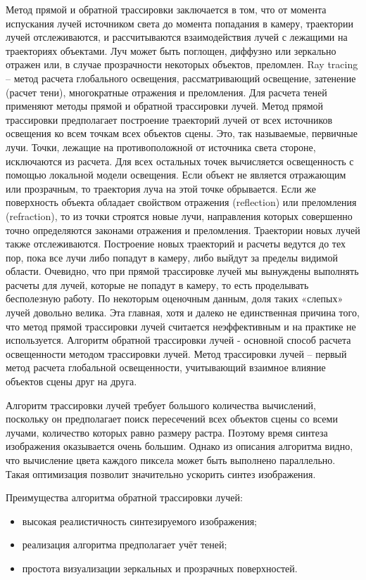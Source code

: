 Метод прямой и обратной трассировки \cite{ray} заключается в том, что от момента испускания лучей
источником света до момента попадания в камеру, траектории лучей отслеживаются, и рассчитываются
взаимодействия лучей с лежащими на траекториях объектами. Луч может быть поглощен, диффузно или
зеркально отражен или, в случае прозрачности некоторых объектов, преломлен.
Ray tracing – метод расчета глобального освещения, рассматривающий освещение, затенение
(расчет тени), многократные отражения и преломления.
Для расчета теней применяют методы прямой и обратной трассировки лучей.
Метод прямой трассировки предполагает построение траекторий лучей от всех источников
освещения ко всем точкам всех объектов сцены. Это, так называемые, первичные лучи. Точки,
лежащие на противоположной от источника света стороне, исключаются из расчета. Для всех
остальных точек вычисляется освещенность с помощью локальной модели освещения. Если
объект не является отражающим или прозрачным, то траектория луча на этой точке обрывается. Если
же поверхность объекта обладает свойством отражения (reflection) или преломления (refraction), то из
точки строятся новые лучи, направления которых совершенно точно определяются законами
отражения и преломления. Траектории новых лучей также отслеживаются. Построение новых
траекторий и расчеты ведутся до тех пор, пока все лучи либо попадут в камеру, либо выйдут за
пределы видимой области. Очевидно, что при прямой трассировке лучей мы вынуждены
выполнять расчеты для лучей, которые не попадут в камеру, то есть проделывать бесполезную
работу. По некоторым оценочным данным, доля таких «слепых» лучей довольно велика. Эта
главная, хотя и далеко не единственная причина того, что метод прямой трассировки лучей
считается неэффективным и на практике не используется.
Алгоритм обратной трассировки лучей - основной способ расчета освещенности методом
трассировки лучей. Метод трассировки лучей – первый метод расчета глобальной освещенности,
учитывающий взаимное влияние объектов сцены друг на друга.

Алгоритм трассировки лучей требует большого количества вычислений, поскольку он
предполагает поиск пересечений всех объектов сцены со всеми лучами, количество которых
равно размеру растра. Поэтому время синтеза изображения оказывается очень большим.
Однако из описания алгоритма видно, что вычисление цвета каждого пиксела может быть
выполнено параллельно. Такая оптимизация позволит значительно ускорить синтез изображения.

Преимущества алгоритма обратной трассировки лучей:
\begin{itemize}
	\item высокая реалистичность синтезируемого изображения;
	\item реализация алгоритма предполагает учёт теней;
	\item простота визуализации зеркальных и прозрачных поверхностей.
\end{itemize}

